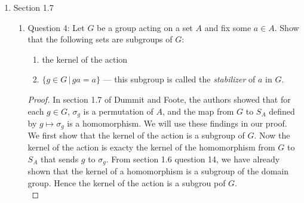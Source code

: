 \documentclass{article}
\begin{document}
\begin{enumerate}
\begin{enumerate}
\begin{proof}
          To find $\ker(\pi_1)$, we wish to find $(a,b)\in A\times B$ such
          that $pi_1((a,b))=a=1_A$. Clearly, we get
          $\ker(\pi_1)=\{1_A\}\times B$. Similarly for $\pi_2$, we get
          $\ker(\pi_2)=A\times\{1_B\}$.
        \end{proof}
    \end{enumerate}

  \item Section 1.7
    \begin{enumerate}
      \item Question 4: Let $G$ be a group acting on a set $A$ and fix some
        $a\in A$. Show that the following sets are subgroups of $G$:
        \begin{enumerate}
          \item the kernel of the action
          \item $\{g\in G\,|\,ga=a\}$ --- this subgroup is called the
            \textit{stabilizer} of $a$ in $G$.
        \end{enumerate}

        \begin{proof}
          In section 1.7 of Dummit and Foote, the authors showed that for
          each $g\in G$, $\sigma_g$ is a permutation of $A$, and the map
          from $G$ to $S_A$ defined by $g\mapsto\sigma_g$ is a
          homomorphism. We will use these findings in our proof. \\

          We first show that the kernel of the action is a subgroup of
          $G$. Now the kernel of the action is exacty the kernel of the
          homomorphism from $G$ to $S_A$ that sends $g$ to $\sigma_g$. From
          section 1.6 question 14, we have already shown that the kernel of
          a homomorphism is a subgroup of the domain group. Hence the
          kernel of the action is a subgrou pof $G$. \\


\end{proof}
\end{enumerate}
\end{enumerate}
\end{document}
